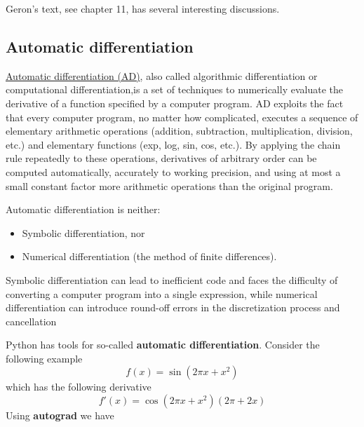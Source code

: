 \documentclass[%
oneside,                 %
final,                   %
10pt]{article}
\begin{document}
\noindent
Geron's text, see chapter 11, has several interesting discussions.



\subsection*{Automatic differentiation}

\href{{https://en.wikipedia.org/wiki/Automatic_differentiation}}{Automatic differentiation (AD)}, 
also called algorithmic
differentiation or computational differentiation,is a set of
techniques to numerically evaluate the derivative of a function
specified by a computer program. AD exploits the fact that every
computer program, no matter how complicated, executes a sequence of
elementary arithmetic operations (addition, subtraction,
multiplication, division, etc.) and elementary functions (exp, log,
sin, cos, etc.). By applying the chain rule repeatedly to these
operations, derivatives of arbitrary order can be computed
automatically, accurately to working precision, and using at most a
small constant factor more arithmetic operations than the original
program.

Automatic differentiation is neither:

\begin{itemize}
\item Symbolic differentiation, nor

\item Numerical differentiation (the method of finite differences).
\end{itemize}

\noindent
Symbolic differentiation can lead to inefficient code and faces the
difficulty of converting a computer program into a single expression,
while numerical differentiation can introduce round-off errors in the
discretization process and cancellation



Python has tools for so-called \textbf{automatic differentiation}.
Consider the following example
\[
f(x) = \sin\left(2\pi x + x^2\right)
\]
which has the following derivative
\[
f'(x) = \cos\left(2\pi x + x^2\right)\left(2\pi + 2x\right) 
\]
Using \textbf{autograd} we have
\end{document}
